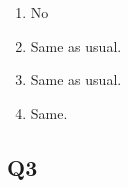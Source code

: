 \documentclass{article}
\begin{document}
\begin{enumerate}
\item No
\end{enumerate}

\begin{enumerate}
\setcounter{enumii}{1}
\item Same as usual.
\end{enumerate}

\begin{enumerate}
\setcounter{enumii}{2}
\item Same as usual.
\end{enumerate}

\begin{enumerate}
\setcounter{enumii}{3}
\item Same.
\end{enumerate}



\subsection{Q3}
\end{document}
